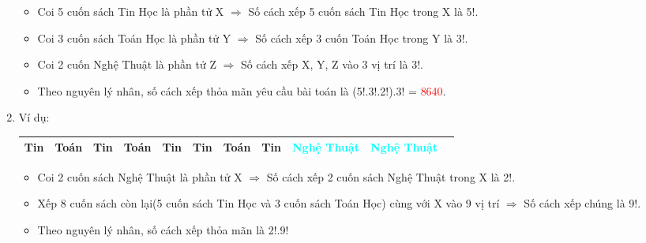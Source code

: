 \documentclass[12pt,oneside]{book}
\begin{document}
\begin{enumerate}[label = \alph*)]
\begin{itemize}
	\item Coi 5 cuốn sách Tin Học là phần tử X $\Rightarrow$ Số cách xếp 5 cuốn sách Tin Học trong X là 5!.
	\item Coi 3 cuốn sách Toán Học là phần tử Y $\Rightarrow$ Số cách xếp 3 cuốn Toán Học trong Y là 3!.
	\item Coi 2 cuốn Nghệ Thuật là phần tử Z $\Rightarrow$ Số cách xếp X, Y, Z vào 3 vị trí là 3!.
	\item Theo nguyên lý nhân, số cách xếp thỏa mãn yêu cầu bài toán là (5!.3!.2!).3! = \textcolor{red}{8640}.
\end{itemize}
\item Ví dụ:
\begin{center}
	\begin{tabular}{|c|c|c|c|c|c|c|c|c|c|c|}
		\hline
		Tin&Toán&Tin&Toán&Tin&Tin&Toán&Tin&\textcolor{cyan}{Nghệ Thuật}&\textcolor{cyan}{Nghệ Thuật}  \\
		\hline
	\end{tabular}
\end{center}
\begin{itemize}
	\item Coi 2 cuốn sách Nghệ Thuật là phần tử X $\Rightarrow$ Số cách xếp 2 cuốn sách Nghệ Thuật trong X là 2!.
	\item Xếp 8 cuốn sách còn lại(5 cuốn sách Tin Học và 3 cuốn sách Toán Học) cùng với X vào 9 vị trí $\Rightarrow$ Số cách xếp chúng là 9!.
	\item Theo nguyên lý nhân, số cách xếp thỏa mãn là 2!.9!
\end{itemize}
\end{enumerate}
\end{document}
